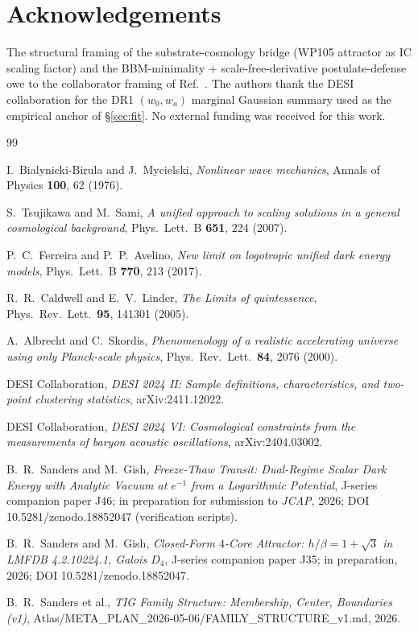 \documentclass[aps,prl,reprint,floatfix,nofootinbib]{revtex4-2}
\begin{document}
\section*{Acknowledgements}

The structural framing of the substrate-cosmology bridge
(WP105 attractor as IC scaling factor) and the BBM-minimality
+ scale-free-derivative postulate-defense owe to the
collaborator framing of Ref.~\cite{FamilyStructure2026}. The
authors thank the DESI collaboration for the DR1
$(w_0, w_a)$ marginal Gaussian summary used as the
empirical anchor of \S\ref{sec:fit}. No external funding was
received for this work.

\begin{thebibliography}{99}

I.~Bialynicki-Birula and J.~Mycielski,
\emph{Nonlinear wave mechanics},
Annals of Physics \textbf{100}, 62 (1976).

S.~Tsujikawa and M.~Sami,
\emph{A unified approach to scaling solutions in a general
cosmological background},
Phys.\ Lett.\ B \textbf{651}, 224 (2007).

P.~C.~Ferreira and P.~P.~Avelino,
\emph{New limit on logotropic unified dark energy models},
Phys.\ Lett.\ B \textbf{770}, 213 (2017).

R.~R.~Caldwell and E.~V.~Linder,
\emph{The Limits of quintessence},
Phys.\ Rev.\ Lett.\ \textbf{95}, 141301 (2005).

A.~Albrecht and C.~Skordis,
\emph{Phenomenology of a realistic accelerating universe
using only Planck-scale physics},
Phys.\ Rev.\ Lett.\ \textbf{84}, 2076 (2000).

DESI Collaboration,
\emph{DESI 2024 II: Sample definitions, characteristics, and
two-point clustering statistics},
arXiv:2411.12022.

DESI Collaboration,
\emph{DESI 2024 VI: Cosmological constraints from the
measurements of baryon acoustic oscillations},
arXiv:2404.03002.

B.~R.~Sanders and M.~Gish,
\emph{Freeze-Thaw Transit: Dual-Regime Scalar Dark Energy
with Analytic Vacuum at $e^{-1}$ from a Logarithmic
Potential},
J-series companion paper J46;
in preparation for submission to \emph{JCAP}, 2026;
DOI 10.5281/zenodo.18852047 (verification scripts).

B.~R.~Sanders and M.~Gish,
\emph{Closed-Form $4$-Core Attractor: $h/\beta = 1+\sqrt{3}$
in LMFDB 4.2.10224.1, Galois $D_4$},
J-series companion paper J35; in preparation, 2026;
DOI 10.5281/zenodo.18852047.

B.~R.~Sanders et al.,
\emph{TIG Family Structure: Membership, Center, Boundaries
(v1)},
Atlas/META\_PLAN\_2026-05-06/FAMILY\_STRUCTURE\_v1.md, 2026.

\end{thebibliography}
\end{document}

